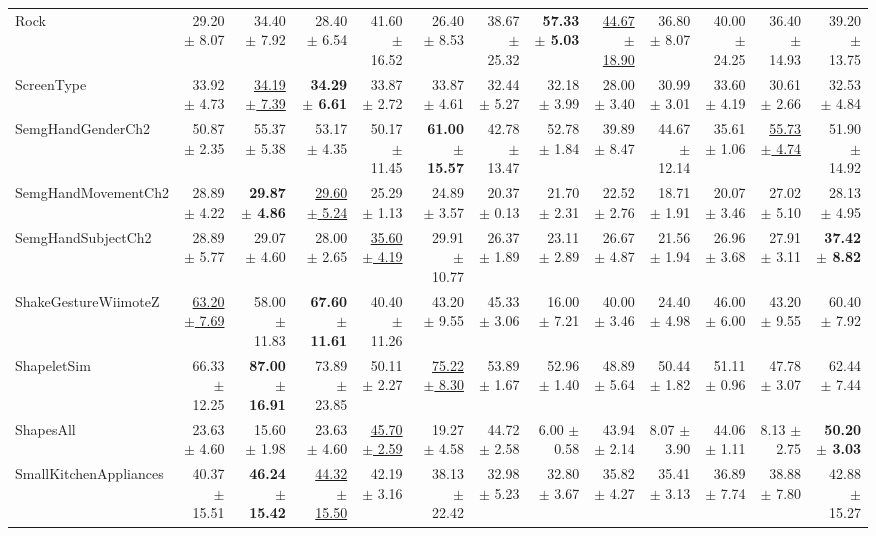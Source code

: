 \begin{landscape}
\begin{longtable}{lrrrrrrrrrrrr}
Rock & 29.20 $\pm$ 8.07 & 34.40 $\pm$ 7.92 & 28.40 $\pm$ 6.54 & 41.60 $\pm$ 16.52 & 26.40 $\pm$ 8.53 & 38.67 $\pm$ 25.32 & \textbf{57.33 $\pm$ 5.03} & \underline{44.67 $\pm$ 18.90} & 36.80 $\pm$ 8.07 & 40.00 $\pm$ 24.25 & 36.40 $\pm$ 14.93 & 39.20 $\pm$ 13.75 \\
ScreenType & 33.92 $\pm$ 4.73 & \underline{34.19 $\pm$ 7.39} & \textbf{34.29 $\pm$ 6.61} & 33.87 $\pm$ 2.72 & 33.87 $\pm$ 4.61 & 32.44 $\pm$ 5.27 & 32.18 $\pm$ 3.99 & 28.00 $\pm$ 3.40 & 30.99 $\pm$ 3.01 & 33.60 $\pm$ 4.19 & 30.61 $\pm$ 2.66 & 32.53 $\pm$ 4.84 \\
SemgHandGenderCh2 & 50.87 $\pm$ 2.35 & 55.37 $\pm$ 5.38 & 53.17 $\pm$ 4.35 & 50.17 $\pm$ 11.45 & \textbf{61.00 $\pm$ 15.57} & 42.78 $\pm$ 13.47 & 52.78 $\pm$ 1.84 & 39.89 $\pm$ 8.47 & 44.67 $\pm$ 12.14 & 35.61 $\pm$ 1.06 & \underline{55.73 $\pm$ 4.74} & 51.90 $\pm$ 14.92 \\
SemgHandMovementCh2 & 28.89 $\pm$ 4.22 & \textbf{29.87 $\pm$ 4.86} & \underline{29.60 $\pm$ 5.24} & 25.29 $\pm$ 1.13 & 24.89 $\pm$ 3.57 & 20.37 $\pm$ 0.13 & 21.70 $\pm$ 2.31 & 22.52 $\pm$ 2.76 & 18.71 $\pm$ 1.91 & 20.07 $\pm$ 3.46 & 27.02 $\pm$ 5.10 & 28.13 $\pm$ 4.95 \\
SemgHandSubjectCh2 & 28.89 $\pm$ 5.77 & 29.07 $\pm$ 4.60 & 28.00 $\pm$ 2.65 & \underline{35.60 $\pm$ 4.19} & 29.91 $\pm$ 10.77 & 26.37 $\pm$ 1.89 & 23.11 $\pm$ 2.89 & 26.67 $\pm$ 4.87 & 21.56 $\pm$ 1.94 & 26.96 $\pm$ 3.68 & 27.91 $\pm$ 3.11 & \textbf{37.42 $\pm$ 8.82} \\
ShakeGestureWiimoteZ & \underline{63.20 $\pm$ 7.69} & 58.00 $\pm$ 11.83 & \textbf{67.60 $\pm$ 11.61} & 40.40 $\pm$ 11.26 & 43.20 $\pm$ 9.55 & 45.33 $\pm$ 3.06 & 16.00 $\pm$ 7.21 & 40.00 $\pm$ 3.46 & 24.40 $\pm$ 4.98 & 46.00 $\pm$ 6.00 & 43.20 $\pm$ 9.55 & 60.40 $\pm$ 7.92 \\
ShapeletSim & 66.33 $\pm$ 12.25 & \textbf{87.00 $\pm$ 16.91} & 73.89 $\pm$ 23.85 & 50.11 $\pm$ 2.27 & \underline{75.22 $\pm$ 8.30} & 53.89 $\pm$ 1.67 & 52.96 $\pm$ 1.40 & 48.89 $\pm$ 5.64 & 50.44 $\pm$ 1.82 & 51.11 $\pm$ 0.96 & 47.78 $\pm$ 3.07 & 62.44 $\pm$ 7.44 \\
ShapesAll & 23.63 $\pm$ 4.60 & 15.60 $\pm$ 1.98 & 23.63 $\pm$ 4.60 & \underline{45.70 $\pm$ 2.59} & 19.27 $\pm$ 4.58 & 44.72 $\pm$ 2.58 & 6.00 $\pm$ 0.58 & 43.94 $\pm$ 2.14 & 8.07 $\pm$ 3.90 & 44.06 $\pm$ 1.11 & 8.13 $\pm$ 2.75 & \textbf{50.20 $\pm$ 3.03} \\
SmallKitchenAppliances & 40.37 $\pm$ 15.51 & \textbf{46.24 $\pm$ 15.42} & \underline{44.32 $\pm$ 15.50} & 42.19 $\pm$ 3.16 & 38.13 $\pm$ 22.42 & 32.98 $\pm$ 5.23 & 32.80 $\pm$ 3.67 & 35.82 $\pm$ 4.27 & 35.41 $\pm$ 3.13 & 36.89 $\pm$ 7.74 & 38.88 $\pm$ 7.80 & 42.88 $\pm$ 15.27 \\

\end{longtable}
\end{landscape}
